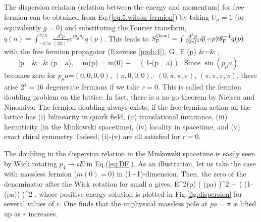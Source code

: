 The dispersion relation (relation between the energy and momentum)
for free fermion can be obtained from Eq.(\ref{eq:5.wilson-fermion}) by taking $U_{\mu}=1$ (or equivalently $g=0$)
and substituting  the Fourier transform,
$q(n) = \int_{-\pi/a}^{\pi/a} \frac{d^4p}{(2\pi)^4} e^{i p_{\mu} n_{\mu}} q(p)$.
 This leads to $S_{\rm F}^{\rm (free)}= \int \frac{d^4p}{(2\pi)^4} \bar{q}(-p) {\cal G}_{\rm F}^{-1} q(p)$ with the
 free fermion propagator (Exercise  \ref{prob:4}),
 \beq
 \label{eq:DF}
 {\cal G}_{\rm F} (p) &=& ,  \\
 \label{eq:Mp}
 \ \ \ \ \bar{p}_{\mu} &=&  \sin (p_{\mu} a), \ \  m(p)  =  m(0) +   \sum_{\mu}      \left( 1-\cos (p_{\mu} a) \right)  .
 \eeq
Since $\sin (p_{\mu} a)$ becomes zero
 for $p_{\mu}a$=$(0,0,0,0)$, $(\pi, 0,0,0)$,$ \cdot $
  $(0,\pi,\pi,\pi)$, $(\pi,\pi,\pi,\pi)$, there arise
  $2^4 =16$ degenerate fermions  if we take  $r=0$.
 This is called the fermion doubling problem on the 
 lattice. In fact, there is a no-go theorem
 by  Nielsen and Ninomiya: 
 The  fermion doubling always exists, if the free fermion action  on the lattice
 has (i) bilinearity in quark field, 
  (ii) translational invariance,
   (iii) hermiticity (in the Minkowski spacetime),
    (iv) locality in spacetime, and (v) exact chiral symmetry.
Indeed, (i)-(v) are all satisfied for $r=0$.

The doubling in the dispersion relation in  the Minkowski spacetime is easily seen by Wick rotating 
$p_4 \rightarrow i E$ in Eq.(\ref{eq:DF}).  As an illustration, let us take the case with massless fermion ($m(0)=0$)
in (1+1)-dimension.  Then, the zero of the denominator after the Wick rotation for small $a$ gives,
\beq
E^2(p) \simeq \left(  \sin (pa) \right)^2 + \left(   (1-\cos(pa)) \right)^2 ,
\eeq
whose positive energy solution is plotted in Fig.\ref{fig:dispersion} for several values of $r$.
One finds that the unphysical massless pole at $pa=\pi$ is lifted up as $r$ increases.

